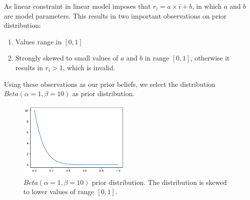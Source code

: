 \documentclass[12pt]{article}
\theoremstyle{definition}
\begin{document}
As linear constraint in linear model imposes that $r_i = a\times i + b$, in
which $a$ and $b$ are model parameters. This results in two important observations on
prior distribution:
\begin{enumerate}
\item Values range in $[0,1]$
\item Strongly skewed to small values of $a$ and $b$ in range $[0,1]$, otherwise it results in
  $r_i>1$, which is invalid.
\end{enumerate}
Using these observations as our prior beliefs, we select the distribution
$Beta(\alpha=1,\beta=10)$ as prior distribution.
\begin{figure}[H]
  \centering
  \includegraphics[width=0.5\textwidth,keepaspectratio]{figures/beta_1_10.png}
  \caption{$Beta(\alpha=1,\beta=10)$ prior distribution. The distribution is
    skewed to lower values of range $[0,1]$.}
\end{figure}
\end{document}
